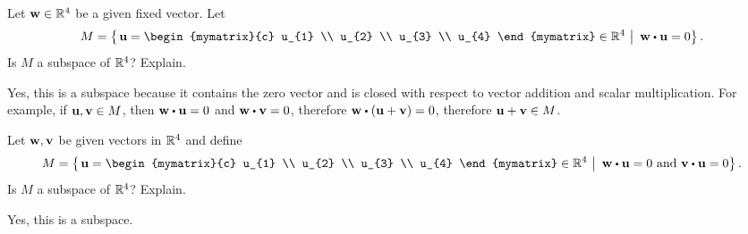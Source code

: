 \begin{ex}
  Let $\vect{w}\in \R^4$ be a given fixed vector. Let
  \begin{equation*}
    M=\set{\left.\vect{u}
        =\begin{mymatrix}{c}
          u_{1} \\ u_{2} \\ u_{3} \\ u_{4}
        \end{mymatrix} \in \R^4~\right\vert~ \vect{w}\dotprod \vect{u}
      =0}.
  \end{equation*}
  Is $M$ a subspace of $\mathbb{R}^4$? Explain.
  \begin{sol}
    Yes, this is a subspace because it contains the zero vector and is
    closed with respect to vector addition and scalar
    multiplication. For example, if $\vect{u},\vect{v}\in M$, then
    $\vect{w}\dotprod\vect{u}=0$ and $\vect{w}\dotprod\vect{v}=0$,
    therefore $\vect{w}\dotprod(\vect{u}+\vect{v})=0$, therefore
    $\vect{u}+\vect{v}\in M$.
  \end{sol}
\end{ex}

\begin{ex}
  Let $\vect{w},\vect{v}$ be given vectors in $\mathbb{R}^4$ and define
  \begin{equation*}
    M=\set{\left.\vect{u}=\begin{mymatrix}{c}
        u_{1} \\ u_{2} \\ u_{3} \\ u_{4}
      \end{mymatrix} \in \R^4
      ~\right\vert~
    \vect{w}\dotprod \vect{u}=0\text{ and }\vect{v}\dotprod \vect{u}=0}.
  \end{equation*}
  Is $M$ a subspace of $\mathbb{R}^4$? Explain.
  \begin{sol}
    Yes, this is a subspace.
  \end{sol}
\end{ex}

